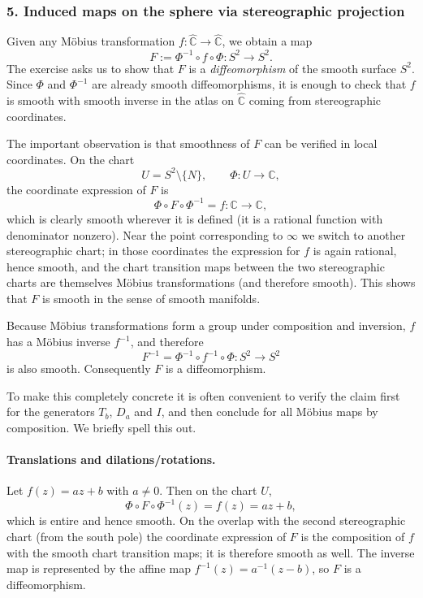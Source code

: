 \documentclass[12pt,a4paper]{article}
\theoremstyle{plain}
\theoremstyle{definition}      %
\begin{document}
	\subsubsection*{5. Induced maps on the sphere via stereographic projection}
	
	Given any Möbius transformation
	$f:\widehat{\mathbb{C}}\to\widehat{\mathbb{C}}$, we obtain a map
	\[
	F := \Phi^{-1}\circ f\circ\Phi : S^{2} \longrightarrow S^{2}.
	\]
	The exercise asks us to show that $F$ is a \emph{diffeomorphism} of the
	smooth surface $S^{2}$.  Since $\Phi$ and $\Phi^{-1}$ are already smooth
	diffeomorphisms, it is enough to check that $f$ is smooth with smooth
	inverse in the atlas on $\widehat{\mathbb{C}}$ coming from stereographic
	coordinates.
	
	The important observation is that smoothness of $F$ can be verified in
	local coordinates.  On the chart
	\[
	U = S^{2}\setminus\{N\},\qquad \Phi:U\to\mathbb{C},
	\]
	the coordinate expression of $F$ is
	\[
	\Phi\circ F\circ\Phi^{-1} = f:\mathbb{C}\to\mathbb{C},
	\]
	which is clearly smooth wherever it is defined (it is a rational function
	with denominator nonzero).  Near the point corresponding to $\infty$ we
	switch to another stereographic chart; in those coordinates the expression
	for $f$ is again rational, hence smooth, and the chart transition maps
	between the two stereographic charts are themselves Möbius transformations
	(and therefore smooth).  This shows that $F$ is smooth in the sense of
	smooth manifolds.
	
	Because Möbius transformations form a group under composition and inversion,
	$f$ has a Möbius inverse $f^{-1}$, and therefore
	\[
	F^{-1} = \Phi^{-1}\circ f^{-1}\circ \Phi : S^{2}\to S^{2}
	\]
	is also smooth.  Consequently $F$ is a diffeomorphism.
	
	To make this completely concrete it is often convenient to verify the claim
	first for the generators $T_b$, $D_a$ and $I$, and then conclude for all
	Möbius maps by composition.  We briefly spell this out.
	
	\paragraph{Translations and dilations/rotations.}
	Let $f(z)=az+b$ with $a\neq 0$.  Then on the chart $U$,
	\[
	\Phi\circ F\circ\Phi^{-1}(z) = f(z) = az+b,
	\]
	which is entire and hence smooth.  On the overlap with the second
	stereographic chart (from the south pole) the coordinate expression of $F$
	is the composition of $f$ with the smooth chart transition maps; it is
	therefore smooth as well.  The inverse map is represented by the affine map
	$f^{-1}(z) = a^{-1}(z-b)$, so $F$ is a diffeomorphism.
	
\end{document}
